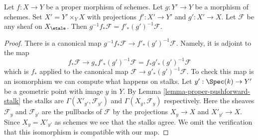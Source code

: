 \begin{lemma}
\label{lemma-proper-base-change-f-star}
Let $f : X \to Y$ be a proper morphism of schemes. Let $g : Y' \to Y$
be a morphism of schemes. Set $X' = Y' \times_Y X$ with projections
$f' : X' \to Y'$ and $g' : X' \to X$. Let $\mathcal{F}$ be any sheaf on
$X_\etale$. Then $g^{-1}f_*\mathcal{F} = f'_*(g')^{-1}\mathcal{F}$.
\end{lemma}

\begin{proof}
There is a canonical map $g^{-1}f_*\mathcal{F} \to f'_*(g')^{-1}\mathcal{F}$.
Namely, it is adjoint to the map
$$
f_*\mathcal{F} \longrightarrow
g_*f'_*(g')^{-1}\mathcal{F} = f_*g'_*(g')^{-1}\mathcal{F}
$$
which is $f_*$ applied to the canonical map
$\mathcal{F} \to g'_*(g')^{-1}\mathcal{F}$. To check this map is an
isomorphism we can compute what happens on stalks.
Let $y' : \Spec(k) \to Y'$ be a geometric point with image $y$ in $Y$.
By Lemma \ref{lemma-proper-pushforward-stalk} the stalks are
$\Gamma(X'_{y'}, \mathcal{F}_{y'})$ and $\Gamma(X_y, \mathcal{F}_y)$
respectively. Here the sheaves $\mathcal{F}_y$ and $\mathcal{F}_{y'}$
are the pullbacks of $\mathcal{F}$ by the projections $X_y \to X$
and $X'_{y'} \to X$. Since $X_y = X'_{y'}$ as schemes
we see that the stalks agree. We omit the
verification that this isomorphism is compatible with our map.
\end{proof}
